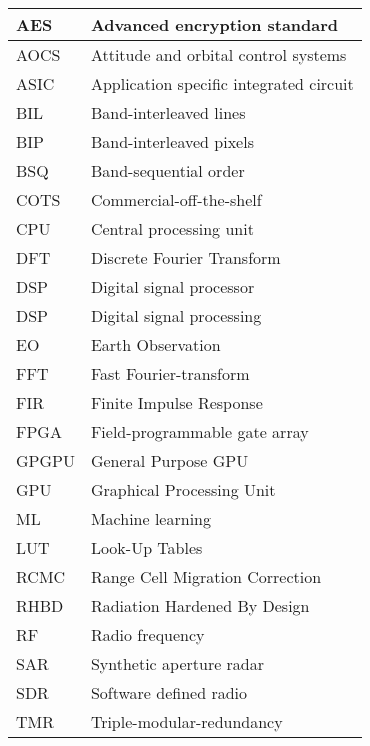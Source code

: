 \documentclass{report}
\begin{document}
\begin{tabular}{|l|l|}
\hline
AES	    & Advanced encryption standard              \\ \hline
AOCS    & Attitude and orbital control systems      \\ \hline
ASIC	& Application specific integrated circuit   \\ \hline
BIL	    & Band-interleaved lines                    \\ \hline
BIP	    & Band-interleaved pixels                   \\ \hline
BSQ	    & Band-sequential order                     \\ \hline
COTS    & Commercial-off-the-shelf                  \\ \hline
CPU	    & Central processing unit                   \\ \hline
DFT     & Discrete Fourier Transform                \\ \hline
DSP	    & Digital signal processor                  \\ \hline
DSP	    & Digital signal processing                 \\ \hline
EO	    & Earth Observation                         \\ \hline
FFT	    & Fast Fourier-transform                    \\ \hline
FIR     & Finite Impulse Response                   \\ \hline
FPGA	& Field-programmable gate array             \\ \hline
GPGPU   & General Purpose GPU                       \\ \hline
GPU     & Graphical Processing Unit                 \\ \hline
ML      & Machine learning                          \\ \hline
LUT     & Look-Up Tables                            \\ \hline
RCMC    & Range Cell Migration Correction           \\ \hline
RHBD    & Radiation Hardened By Design              \\ \hline
RF	    & Radio frequency                           \\ \hline
SAR	    & Synthetic aperture radar                  \\ \hline
SDR	    & Software defined radio                    \\ \hline
TMR	    & Triple-modular-redundancy                 \\ \hline
\end{tabular}
\label{tab:acronyms}
\end{document}
